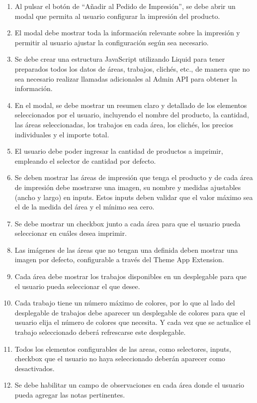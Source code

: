\documentclass[11pt]{article}
\begin{document}
\begin{enumerate}[label=\arabic*.]
    \item Al pulsar el botón de ``Añadir al Pedido de Impresión'', se debe abrir un modal que permita al usuario configurar la impresión del producto.
    \item El modal debe mostrar toda la información relevante sobre la impresión y permitir al usuario ajustar la configuración según sea necesario.
    \item Se debe crear una estructura JavaScript utilizando Liquid para tener preparados todos los datos de áreas, trabajos, clichés, etc., de manera que no sea necesario realizar llamadas adicionales al Admin API para obtener la información.
    \item En el modal, se debe mostrar un resumen claro y detallado de los elementos seleccionados por el usuario, incluyendo el nombre del producto, la cantidad, las áreas seleccionadas, los trabajos en cada área, los clichés, los precios individuales y el importe total.
    \item El usuario debe poder ingresar la cantidad de productos a imprimir, empleando el selector de cantidad por defecto.
    \item Se deben mostrar las áreas de impresión que tenga el producto y de cada área de impresión debe mostrarse una imagen, su nombre y medidas ajustables (ancho y largo) en inputs. Estos inputs deben validar que el valor máximo sea el de la medida del área y el mínimo sea cero.
    \item Se debe mostrar un checkbox junto a cada área para que el usuario pueda seleccionar en cuáles desea imprimir.
    \item Las imágenes de las áreas que no tengan una definida deben mostrar una imagen por defecto, configurable a través del Theme App Extension.
    \item Cada área debe mostrar los trabajos disponibles en un desplegable para que el usuario pueda seleccionar el que desee.
    \item Cada trabajo tiene un número máximo de colores, por lo que al lado del desplegable de trabajos debe aparecer un desplegable de colores para que el usuario elija el número de colores que necesita. Y cada vez que se actualice el trabajo seleccionado deberá refrescarse este desplegable.
    \item Todos los elementos configurables de las areas, como selectores, inputs, checkbox que el usuario no haya seleccionado deberán aparecer como desactivados.
    \item Se debe habilitar un campo de observaciones en cada área donde el usuario pueda agregar las notas pertinentes.

\end{enumerate}
\end{document}
